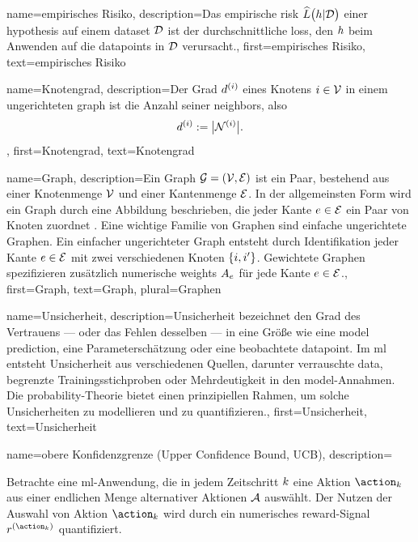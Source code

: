 {{{
{
	name={empirisches Risiko},
	description={Das empirische \gls{risk} 
		$\widehat{L}\big(h|\mathcal{D}\big)$ einer \gls{hypothesis} auf einem 
		\gls{dataset} $\mathcal{D}$ ist der durchschnittliche \gls{loss}, 
		den $h$ beim Anwenden auf die \gls{datapoint}s in $\mathcal{D}$ verursacht.},
	first={empirisches Risiko}, text={empirisches Risiko}
}

{
	name={Knoten­grad},
	description={Der Grad $d^{(i)}$ eines Knotens 
		$i \in \mathcal{V}$ in einem ungerichteten \gls{graph} ist die Anzahl seiner 
		\gls{neighbors}, also 
		\[
		d^{(i)} := \big| \mathcal{N}^{(i)} \big|.
		\]},
	first={Knotengrad}, text={Knotengrad}
}

{
	name={Graph},
	description={Ein  Graph $\mathcal{G} = \left( \mathcal{V},\mathcal{E} \right)$ ist ein Paar, bestehend aus 
		einer Knotenmenge $\mathcal{V}$ und einer Kantenmenge $\mathcal{E}$. In der allgemeinsten Form wird ein Graph durch eine Abbildung beschrieben, 
		die jeder Kante $e \in \mathcal{E}$ ein Paar von Knoten zuordnet \cite{RockNetworks}. 
		Eine wichtige Familie von Graphen sind einfache ungerichtete Graphen. Ein einfacher ungerichteter Graph entsteht durch Identifikation 
		jeder Kante $e \in \mathcal{E}$ mit zwei verschiedenen Knoten $\{i, i'\}$. 
		Gewichtete Graphen spezifizieren zusätzlich numerische \gls{weights} $A_{e}$ für jede Kante $e \in \mathcal{E}$.},
	first={Graph}, text={Graph}, plural={Graphen}
}


{
	name={Unsicherheit},
	description={Unsicherheit bezeichnet den Grad des Vertrauens — oder das Fehlen desselben — 
		in eine Größe wie eine \gls{model} \gls{prediction}, eine Parameterschätzung oder eine beobachtete \gls{datapoint}. 
		Im \gls{ml} entsteht Unsicherheit aus verschiedenen Quellen, darunter verrauschte \gls{data}, begrenzte Trainingsstichproben 
		oder Mehrdeutigkeit in den \gls{model}-Annahmen. Die \gls{probability}-Theorie bietet einen prinzipiellen Rahmen, 
		um solche Unsicherheiten zu modellieren und zu quantifizieren.},
	first={Unsicherheit}, text={Unsicherheit}
}

{
	name={obere Konfidenzgrenze (Upper Confidence Bound, UCB)},
	description={Betrachte eine  \gls{ml}-Anwendung, 
		die in jedem Zeitschritt $k$ eine Aktion $\action_{\iteridx}$ aus einer endlichen Menge 
		alternativer Aktionen $\mathcal{A}$ auswählt. Der Nutzen der Auswahl von Aktion 
		$\action_{\iteridx}$ wird durch ein numerisches \gls{reward}-Signal $\reward^{(\action_{\iteridx})}$ quantifiziert. 
		
}}}}}
